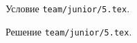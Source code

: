 \problem{}
Условие \texttt{team/junior/5.tex}.

\solution Решение \texttt{team/junior/5.tex}.
\endproblem
